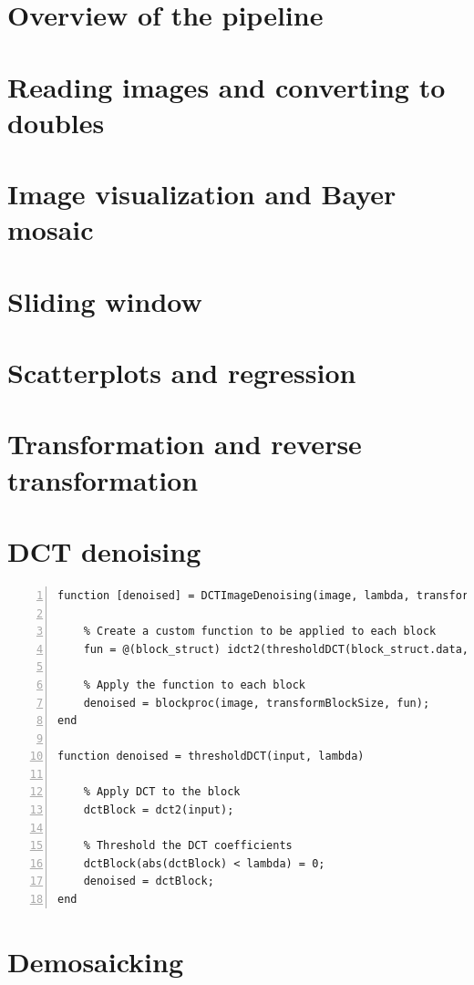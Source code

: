 \documentclass[12pt,a4paper,english
]{tunithesis}
\begin{document}
\section{Overview of the pipeline}

\section{Reading images and converting to doubles}

\section{Image visualization and Bayer mosaic}

\section{Sliding window}

\section{Scatterplots and regression}

\section{Transformation and reverse transformation}

\section{DCT denoising}
\begin{lstlisting}[style=Matlab-editor, numbers=left, basicstyle=\small]
function [denoised] = DCTImageDenoising(image, lambda, transformBlockSize)

    % Create a custom function to be applied to each block
    fun = @(block_struct) idct2(thresholdDCT(block_struct.data, lambda));

    % Apply the function to each block
    denoised = blockproc(image, transformBlockSize, fun);
end

function denoised = thresholdDCT(input, lambda)

    % Apply DCT to the block
    dctBlock = dct2(input);

    % Threshold the DCT coefficients
    dctBlock(abs(dctBlock) < lambda) = 0;
    denoised = dctBlock;
end
\end{lstlisting}

\section{Demosaicking}
\end{document}
